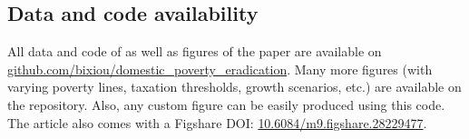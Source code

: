   \begin{small} %





\section*{\normalsize Data and code availability}

All data and code of as well as figures of the paper are available on \href{https://github.com/bixiou/domestic_poverty_eradication}{github.com/bixiou/domestic\_poverty\_eradication}. Many more figures (with varying poverty lines, taxation thresholds, growth scenarios, etc.) are available on the repository. %
Also, any custom figure can be easily produced using this code. The article also comes with a Figshare DOI: \href{https://figshare.com/articles/dataset/dx_doi_org_10_6084_m9_figshare_6025748/6025748}{10.6084/m9.figshare.28229477}.

\end{small}  %

\theendnotes


%  

